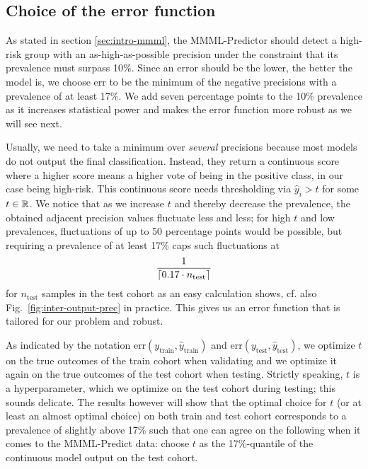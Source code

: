 \subsection{Choice of the error function}\label{sec:error-function}

As stated in section \ref{sec:intro-mmml}, the MMML-Predictor should detect a high-risk group 
with an as-high-as-possible precision under the constraint that its prevalence must surpass 
\num{10}\%. Since an error should be the lower, the better the model is, we choose 
$\text{err}$ to be the minimum of the negative precisions with a prevalence of at least 17\%. We 
add seven percentage points to the \num{10}\% prevalence as it increases statistical power and makes 
the error function more robust as we will see next. 

Usually, we need 
to take a minimum over \textit{several} precisions because most models do not output the final 
classification.
Instead, they return a continuous score where a higher score means a higher vote of being
in the positive class, in our case being high-risk. This continuous score needs thresholding
via $\hat{y}_i > t$ for some $t \in \RR$.
We notice that as we increase $t$ and thereby decrease the prevalence, the obtained 
adjacent precision values fluctuate less and less; for high $t$ and low 
prevalences, fluctuations of up to \num{50} percentage points would be possible, but requiring a 
prevalence of at least 17\% caps such fluctuations at 
\begin{align}
    \frac{1}{\ceil*{\num{0.17} \cdot n_\text{test}}}
\end{align}
for $n_\text{test}$ samples in the test cohort as an easy calculation shows, cf. also Fig.\ 
\ref{fig:inter-output-prec} in practice. This gives us an error function that is tailored 
for our problem and robust.

As indicated by the notation $\text{err}(y_\text{train}, \hat{y}_\text{train})$ and 
$\text{err}(y_\text{test}, \hat{y}_\text{test})$, we optimize $t$ on the true outcomes 
of the train cohort when validating and we optimize it again on the true outcomes of the test cohort 
when testing. Strictly speaking, $t$ is a hyperparameter, which we optimize on the 
test cohort during testing; this sounds delicate. The results however will show that the optimal 
choice for $t$ (or at least an 
almost optimal choice) on both train and test cohort corresponds to a prevalence of 
slightly above 17\% such that one can agree on the following when it comes to the MMML-Predict data: 
choose $t$ as the 17\%-quantile of the continuous model output on the test cohort.

